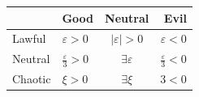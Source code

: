 \documentclass[convert={density=4000,size=1080x800,outext=.png}, margin=5pt]{standalone}
\begin{document}
  \begin{tabular}{@{}llcr@{}} \toprule
    & Good& Neutral& Evil \\\midrule
    Lawful& $\varepsilon >0$& $\vert\varepsilon\vert >0$& $\varepsilon<0$\\[10pt]
    Neutral& $\displaystyle \frac{\varepsilon}{3} > 0$& $\exists \varepsilon$& $\displaystyle \frac{\varepsilon}{3} < 0$\\[10pt]
    Chaotic& $\xi >0$& $\exists \xi$& $3<0$\\\bottomrule
  \end{tabular}
\end{document}
